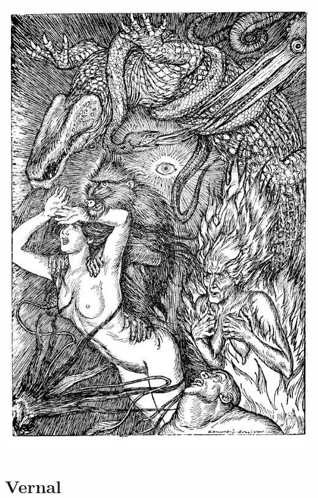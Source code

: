 \documentclass{amsbook}
\begin{document}
\thispagestyle{empty}
\vspace*{\fill}
{\centering
\includegraphics[width=\textwidth]{images/placeholder_image.jpg}}
\vspace*{\fill}
\clearpage

\chapter{Vernal}
\end{document}
